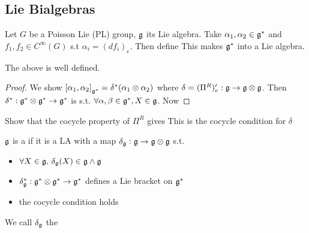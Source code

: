 \documentclass{article}
\begin{document}
\subsection{Lie Bialgebras}

\begin{definition}
Let $G$ be a Poisson Lie (PL) group, $\mf{g}$ its Lie algebra. Take $\alpha_1, \alpha_2 \in \mf{g}^\ast$ and $f_1,f_2 \in C^\infty(G)$ s.t $\alpha_i = (df_i)_e$. Then define
This makes $\mf{g}^\ast$ into a Lie algebra. 
\end{definition}

\begin{lemma}
The above is well defined. 
\end{lemma}
\begin{proof}
We show $\comm[\alpha_1]{\alpha_2}_{\mf{g}^\ast} = \delta^\ast (\alpha_1 \otimes \alpha_2)$ where $\delta = (\Pi^R)^\prime_e : \mf{g} \to \mf{g}\otimes \mf{g}$. Then $\delta^\ast : \mf{g}^\ast \otimes \mf{g}^\ast \to \mf{g}^\ast$ is s.t. $\forall \alpha,\beta\in\mf{g}^\ast, X \in \mf{g}$.
Now 
\end{proof}

\begin{ex}
Show that the cocycle property of $\Pi^R$ gives 
This is the cocycle condition for $\delta$
\end{ex}

\begin{definition}
$\mf{g}$ is a  if it is a LA with a map $\delta_{\mf{g}} : \mf{g} \to \mf{g} \otimes \mf{g}$ s.t. 
\begin{itemize}
    \item $\forall X \in \mf{g}, \, \delta_{\mf{g}}(X) \in \mf{g} \wedge \mf{g}$ 
    \item $\delta_{\mf{g}}^\ast : \mf{g}^\ast \otimes \mf{g}^\ast \to \mf{g}^\ast$ defines a Lie bracket on $\mf{g}^\ast$ 
    \item the cocycle condition holds
\end{itemize}
We call $\delta_{\mf{g}}$ the 
\end{definition}
\end{document}
